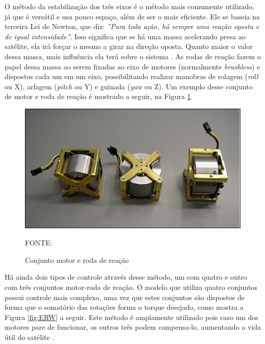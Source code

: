 \documentclass[
	12pt,				%
	openany,			%
	twoside,			%
	a4paper,			%
	english,			%
	french,				%
	spanish,			%
	brazil,				%
	oldfontcommands
	]{abntex2}
\begin{document}

O método da estabilização dos três eixos é o método mais comumente utilizado, já que é versátil e usa pouco espaço, além de ser o mais eficiente. Ele se baseia na terceira Lei de Newton, que diz: \textit{''Para toda ação, há sempre uma reação oposta e de igual intensidade''}. Isso significa que se há uma massa acelerando presa ao satélite, ela irá forçar o mesmo a girar na direção oposta. Quanto maior o valor dessa massa, mais influência ela terá sobre o sistema \cite{Ericksson}. As rodas de reação fazem o papel dessa massa ao serem fixadas ao eixo de motores (normalmente \textit{brushless}) e dispostos cada um em um eixo, possibilitando realizar manobras de rolagem (\textit{roll} ou X), arfagem (\textit{pitch} ou Y) e guinada (\textit{yaw} ou Z). Um exemplo desse conjunto de motor e roda de reação é mostrado a seguir, na Figura \ref{fig:SRW}.

\begin{figure}[th]
	\caption{Conjunto motor e roda de reação}
	\centering
	\includegraphics[width=0.7\linewidth]{./figs/Shelf_Reaction_Wheel}
	
	\begin{small}
		FONTE: \cite{SWR}
	\end{small}
	\label{fig:SRW}
\end{figure}

\newpage 

Há ainda dois tipos de controle através desse método, um com quatro e outro com três conjuntos motor-roda de reação. O modelo que utiliza quatro conjuntos possui controle mais complexo, uma vez que estes conjuntos são dispostos de forma que o somatório das rotações forma o torque desejado, como mostra a Figura \ref{fig:ERW} a seguir. Este método é amplamente utilizado pois caso um dos motores pare de funcionar, os outros três podem compensa-lo, aumentando a vida útil do satélite \cite{Ericksson}.
\end{document}
